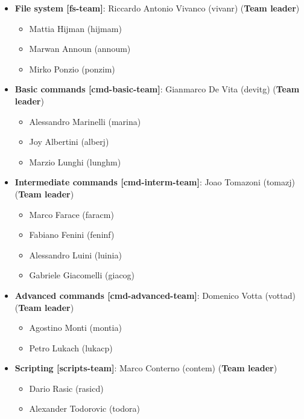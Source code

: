 \documentclass[hidelinks,12pt,a4paper,numbers=enddot]{scrartcl}
\begin{document}
\begin{itemize}
    \item \textbf{File system {[}fs-team{]}}: Riccardo Antonio Vivanco (vivanr) (\textbf{Team leader})
      \begin{itemize}
      \item Mattia Hijman (hijmam)
      \item Marwan Announ (annoum)
      \item Mirko Ponzio (ponzim)
      \end{itemize}
    \item \textbf{Basic commands {[}cmd-basic-team{]}}: Gianmarco De Vita (devitg) (\textbf{Team leader})
      \begin{itemize}
      \item Alessandro Marinelli (marina)
      \item Joy Albertini (alberj)
      \item Marzio Lunghi (lunghm)
      \end{itemize}
    \item \textbf{Intermediate commands {[}cmd-interm-team{]}}: Joao Tomazoni (tomazj) (\textbf{Team leader})
      \begin{itemize}
      \item Marco Farace (faracm)
      \item Fabiano Fenini (feninf)
      \item Alessandro Luini (luinia)
      \item Gabriele Giacomelli (giacog)
      \end{itemize}
    \item \textbf{Advanced commands {[}cmd-advanced-team{]}}: Domenico Votta (vottad) (\textbf{Team leader})
      \begin{itemize}
      \item Agostino Monti (montia)
      \item Petro Lukach (lukacp)
      \end{itemize}
    \item \textbf{Scripting {[}scripts-team{]}}: Marco Conterno (contem) (\textbf{Team leader})
      \begin{itemize}
      \item Dario Rasic (rasicd)
      \item Alexander Todorovic (todora)
      \end{itemize}
\end{itemize}
\end{document}
